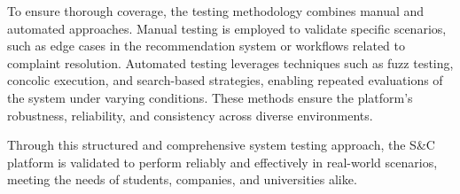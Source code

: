 To ensure thorough coverage, the testing methodology combines manual and automated approaches.
Manual testing is employed to validate specific scenarios, such as edge cases in the recommendation
system or workflows related to complaint resolution. Automated testing leverages techniques such as
fuzz testing, concolic execution, and search-based strategies, enabling repeated evaluations of the
system under varying conditions. These methods ensure the platform’s robustness, reliability, and
consistency across diverse environments.

Through this structured and comprehensive system testing approach, the S\&C platform is validated
to perform reliably and effectively in real-world scenarios, meeting the needs of students,
companies, and universities alike.